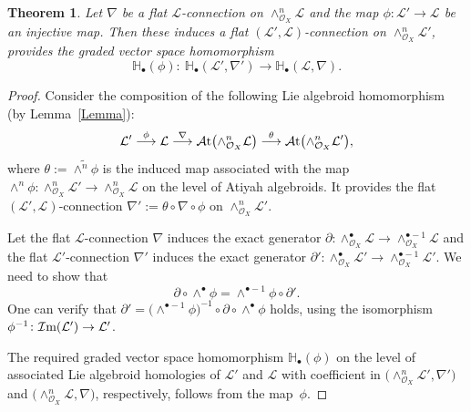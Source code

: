 \documentclass[pdftex]{sigma}
\numberwithin{equation}{section}
\newtheorem{Thm}{Theorem}[section]
\theoremstyle{definition}
\begin{document}
\begin{Thm} \label{on homologies}
Let $\nabla$ be a flat $\mathcal{L}$-connection on $\wedge^n_{\mathcal{O}_X} \mathcal{L}$ and the map $\phi\colon \mathcal{L}' \rightarrow \mathcal{L}$ be an injective map.
	Then these induces a flat $(\mathcal{L}', \mathcal{L})$-connection on $\wedge^n_{\mathcal{O}_X} \mathcal{L}'$, provides the graded vector space homomorphism
\[
\mathbb{H}_{\bullet} (\phi)\colon \ \mathbb{H}_{\bullet}(\mathcal{L}', \nabla') \rightarrow \mathbb{H}_{\bullet}(\mathcal{L}, \nabla).
\]
\end{Thm}
\begin{proof} Consider the composition of the following Lie algebroid homomorphism (by Lemma~\ref{Lemma}):
\[
\mathcal{L}' \overset{\phi}{\longrightarrow}\mathcal{L} \overset{\nabla}{\longrightarrow} \mathcal{A}{\rm t}\bigl(\wedge^n_{\mathcal{O}_X} \mathcal{L}\bigr) \overset{\theta}{\longrightarrow} \mathcal{A}{\rm t}\bigl(\wedge^n_{\mathcal{O}_X} \mathcal{L}'\bigr),
\]
where $\theta:= \widetilde{\wedge^n \phi}$ is the induced map associated with the map $\wedge^n \phi\colon \wedge^n_{\mathcal{O}_X} \mathcal{L}' \rightarrow \wedge^n_{\mathcal{O}_X} \mathcal{L}$ on the level of Atiyah algebroids. It provides the flat $(\mathcal{L}', \mathcal{L})$-connection $\nabla':= \theta \circ \nabla \circ \phi$ on $\wedge^n_{\mathcal{O}_X} \mathcal{L}'$.
	
Let the flat $\mathcal{L}$-connection $\nabla$ induces the exact generator $\partial\colon \wedge^{\bullet}_{\mathcal{O}_X} \mathcal{L} \rightarrow \wedge^{\bullet -1}_{\mathcal{O}_X} \mathcal{L}$ and the flat $\mathcal{L}'$-connection $\nabla'$ induces the exact generator $\partial'\colon \wedge^{\bullet}_{\mathcal{O}_X} \mathcal{L}' \rightarrow \wedge^{\bullet -1}_{\mathcal{O}_X} \mathcal{L}'$. We need to show that
\[
\partial \circ \wedge^\bullet \phi = \wedge^{\bullet - 1} \phi \circ \partial'.
\]
	One can verify that $\partial'= \bigl(\wedge^{\bullet - 1} \phi\bigr)^{-1} \circ \partial \circ \wedge^\bullet \phi$ holds, using the isomorphism $\phi^{-1}\colon \mathcal{I}{\rm m}(\mathcal{L}') \rightarrow \mathcal{L}'$.
	
	The required graded vector space homomorphism $\mathbb{H}_{\bullet} (\phi)$ on the level of associated Lie algebroid homologies of $\mathcal{L}'$ and $\mathcal{L}$ with coefficient in $\bigl(\wedge^n_{\mathcal{O}_X} \mathcal{L}', \nabla'\bigr)$ and $\bigl(\wedge^n_{\mathcal{O}_X} \mathcal{L}, \nabla\bigr)$, respectively, follows from the map~$\phi$.
\end{proof}
\end{document}
